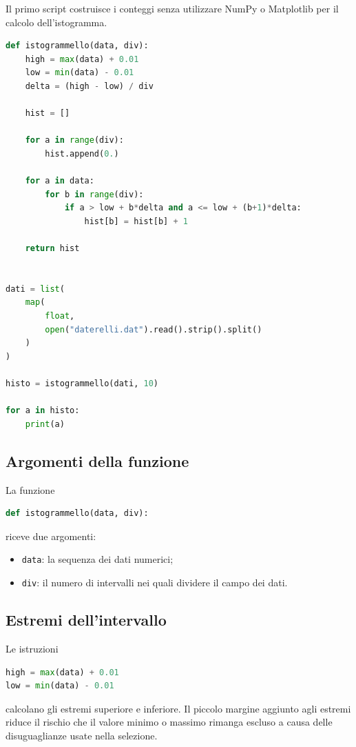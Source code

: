 Il primo script costruisce i conteggi senza utilizzare NumPy o
Matplotlib per il calcolo dell'istogramma.

\begin{lstlisting}[language=Python]
def istogrammello(data, div):
    high = max(data) + 0.01
    low = min(data) - 0.01
    delta = (high - low) / div

    hist = []

    for a in range(div):
        hist.append(0.)

    for a in data:
        for b in range(div):
            if a > low + b*delta and a <= low + (b+1)*delta:
                hist[b] = hist[b] + 1

    return hist


dati = list(
    map(
        float,
        open("daterelli.dat").read().strip().split()
    )
)

histo = istogrammello(dati, 10)

for a in histo:
    print(a)
\end{lstlisting}

\subsection{Argomenti della funzione}

La funzione

\begin{lstlisting}[language=Python]
def istogrammello(data, div):
\end{lstlisting}

riceve due argomenti:

\begin{itemize}
    \item \texttt{data}: la sequenza dei dati numerici;
    \item \texttt{div}: il numero di intervalli nei quali dividere il
          campo dei dati.
\end{itemize}

\subsection{Estremi dell'intervallo}

Le istruzioni

\begin{lstlisting}[language=Python]
high = max(data) + 0.01
low = min(data) - 0.01
\end{lstlisting}

calcolano gli estremi superiore e inferiore. Il piccolo margine aggiunto
agli estremi riduce il rischio che il valore minimo o massimo rimanga
escluso a causa delle disuguaglianze usate nella selezione.

